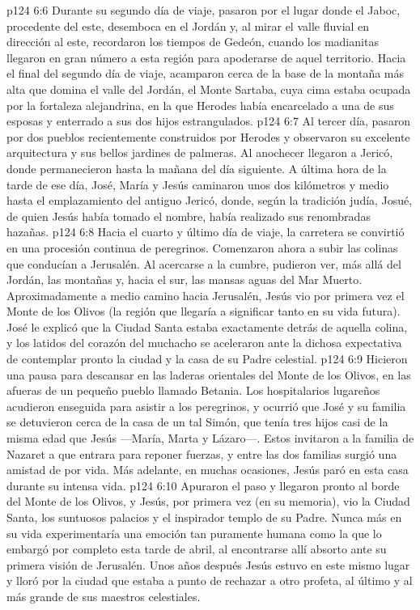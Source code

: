 \vs p124 6:6 \pc Durante su segundo día de viaje, pasaron por el lugar donde el Jaboc, procedente del este, desemboca en el Jordán y, al mirar el valle fluvial en dirección al este, recordaron los tiempos de Gedeón, cuando los madianitas llegaron en gran número a esta región para apoderarse de aquel territorio. Hacia el final del segundo día de viaje, acamparon cerca de la base de la montaña más alta que domina el valle del Jordán, el Monte Sartaba, cuya cima estaba ocupada por la fortaleza alejandrina, en la que Herodes había encarcelado a una de sus esposas y enterrado a sus dos hijos estrangulados.
\vs p124 6:7 Al tercer día, pasaron por dos pueblos recientemente construidos por Herodes y observaron su excelente arquitectura y sus bellos jardines de palmeras. Al anochecer llegaron a Jericó, donde permanecieron hasta la mañana del día siguiente. A última hora de la tarde de ese día, José, María y Jesús caminaron unos dos kilómetros y medio hasta el emplazamiento del antiguo Jericó, donde, según la tradición judía, Josué, de quien Jesús había tomado el nombre, había realizado sus renombradas hazañas.
\vs p124 6:8 Hacia el cuarto y último día de viaje, la carretera se convirtió en una procesión continua de peregrinos. Comenzaron ahora a subir las colinas que conducían a Jerusalén. Al acercarse a la cumbre, pudieron ver, más allá del Jordán, las montañas y, hacia el sur, las mansas aguas del Mar Muerto. Aproximadamente a medio camino hacia Jerusalén, Jesús vio por primera vez el Monte de los Olivos (la región que llegaría a significar tanto en su vida futura). José le explicó que la Ciudad Santa estaba exactamente detrás de aquella colina, y los latidos del corazón del muchacho se aceleraron ante la dichosa expectativa de contemplar pronto la ciudad y la casa de su Padre celestial.
\vs p124 6:9 Hicieron una pausa para descansar en las laderas orientales del Monte de los Olivos, en las afueras de un pequeño pueblo llamado Betania. Los hospitalarios lugareños acudieron enseguida para asistir a los peregrinos, y ocurrió que José y su familia se detuvieron cerca de la casa de un tal Simón, que tenía tres hijos casi de la misma edad que Jesús ---María, Marta y Lázaro---. Estos invitaron a la familia de Nazaret a que entrara para reponer fuerzas, y entre las dos familias surgió una amistad de por vida. Más adelante, en muchas ocasiones, Jesús paró en esta casa durante su intensa vida.
\vs p124 6:10 Apuraron el paso y llegaron pronto al borde del Monte de los Olivos, y Jesús, por primera vez (en su memoria), vio la Ciudad Santa, los suntuosos palacios y el inspirador templo de su Padre. Nunca más en su vida experimentaría una emoción tan puramente humana como la que lo embargó por completo esta tarde de abril, al encontrarse allí absorto ante su primera visión de Jerusalén. Unos años después Jesús estuvo en este mismo lugar y lloró por la ciudad que estaba a punto de rechazar a otro profeta, al último y al más grande de sus maestros celestiales.
